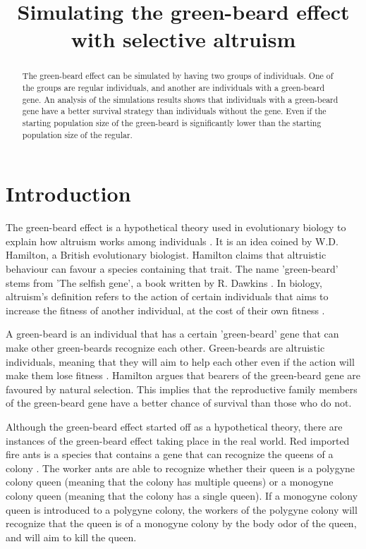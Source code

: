 \documentclass[conference]{IEEEtran}
\begin{document}
	
	\title{Simulating the green-beard effect with selective altruism}
	
	\author{
	}
	
	\maketitle
	
	\begin{abstract}
	The green-beard effect can be simulated by having two groups of individuals. One of the groups are regular individuals, and another are individuals with a green-beard gene. An analysis of the simulations results shows that individuals with a green-beard gene have a better survival strategy than individuals without the gene. Even if the starting population size of the green-beard is significantly lower than the starting population size of the regular.
	\end{abstract}
	
	\section{Introduction}
	The green-beard effect is a hypothetical theory used in evolutionary biology to explain how altruism works among individuals \cite{hamilton1964genetical}. It is an idea coined by W.D. Hamilton, a British evolutionary biologist. Hamilton claims that altruistic behaviour can favour a species containing that trait. The name 'green-beard' stems from 'The selfish gene', a book written by R. Dawkins \cite{dawkins2017selfish}. In biology, altruism's definition refers to the action of certain individuals that aims to increase the fitness of another individual, at the cost of their own fitness \cite{barrett2008natural}. 
	
	A green-beard is an individual that has a certain 'green-beard' gene that can make other green-beards recognize each other. Green-beards are altruistic individuals, meaning that they will aim to help each other even if the action will make them lose fitness \cite{gardner2010greenbeards}. Hamilton argues that bearers of the green-beard gene are favoured by natural selection. This implies that the reproductive family members of the green-beard gene have a better chance of survival than those who do not.
	
	Although the green-beard effect started off as a hypothetical theory, there are instances of the green-beard effect taking place in the real world. Red imported fire ants is a species that contains a gene that can recognize the queens of a colony \cite{keller1998selfish}. The worker ants are able to recognize whether their queen is a polygyne colony queen (meaning that the colony has multiple queens) or a monogyne colony queen (meaning that the colony has a single queen). If a monogyne colony queen is introduced to a polygyne colony, the workers of the polygyne colony will recognize that the queen is of a monogyne colony by the body odor of the queen, and will aim to kill the queen.
	
\end{document}
